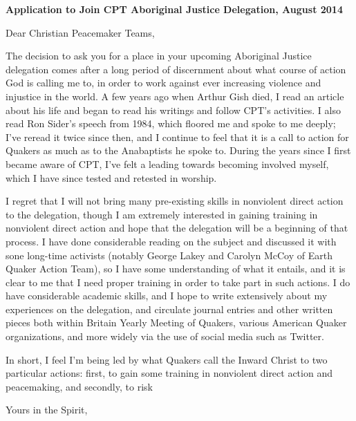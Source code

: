 \documentclass[a4paper,12pt]{letter}
\begin{document}
\begin{letter}{\textbf{Application to Join CPT Aboriginal Justice Delegation, August 2014}}

\opening{Dear Christian Peacemaker Teams,} %

The decision to ask you for a place in your upcoming Aboriginal Justice delegation comes after a long period of discernment about what course of action God is calling me to, in order to work against ever increasing violence and injustice in the world. A few years ago when Arthur Gish died, I read an article about his life and began to read his writings and follow CPT's activities. I also read Ron Sider's speech from 1984, which floored me and spoke to me deeply; I've reread it twice since then, and I continue to feel that it is a call to action for Quakers as much as to the Anabaptists he spoke to. During the years since I first became aware of CPT, I've felt a leading towards becoming involved myself, which I have since tested and retested in worship.

I regret that I will not bring many pre-existing skills in nonviolent direct action to the delegation, though I am extremely interested in gaining training in nonviolent direct action and hope that the delegation will be a beginning of that process. I have done considerable reading on the subject and discussed it with sone long-time activists (notably George Lakey and Carolyn McCoy of Earth Quaker Action Team), so I have some understanding of what it entails, and it is clear to me that I need proper training in order to take part in such actions. I do have considerable academic skills, and I hope to write extensively about my experiences on the delegation, and circulate journal entries and other written pieces both within Britain Yearly Meeting of Quakers, various American Quaker organizations, and more widely via the use of social media such as Twitter.

In short, I feel I'm being led by what Quakers call the Inward Christ to two particular actions: first, to gain some training in nonviolent direct action and peacemaking, and secondly, to risk %




\closing{Yours in the Spirit,} %


\end{letter}
\end{document}
